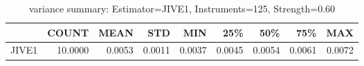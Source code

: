 \begin{table}[ht]
\centering
\caption{variance summary: Estimator=JIVE1, Instruments=125, Strength=0.60}
\begin{tabular}{lrrrrrrrr}
\toprule
 & COUNT & MEAN & STD & MIN & 25\% & 50\% & 75\% & MAX \\
\midrule
JIVE1 & 10.0000 & 0.0053 & 0.0011 & 0.0037 & 0.0045 & 0.0054 & 0.0061 & 0.0072 \\
\bottomrule
\end{tabular}
\end{table}
